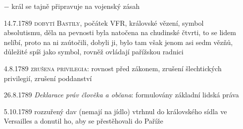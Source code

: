 \documentclass{article}
\begin{document}
\begin{itemize}
    \item[$-$] král se tajně připravuje na vojenský zásah
    \item[14.7.1789] \textsc{dobytí Bastily}, počátek VFR, královské vězení, symbol absolutismu, děla na pevnosti byla natočena na chudinské čtvrti, to se lidem nelíbí, proto na ni zaútočili, dobyli ji, bylo tam však jenom asi sedm vězňů, důležité spíš jako symbol, rovněž ovládají pařížskou radnici
    \item[4.8.1789] \textsc{zrušena privilegia}: rovnost před zákonem, zrušení šlechtických privilegií, zrušení poddanství
    \item[26.8.1789] \textit{Deklarace práv člověka a občana}: formulovány základní lidská práva
    \item[5.10.1789] rozzuřený dav (nemají na jídlo) vtrhnul do královského sídla ve Versailles a donutil ho, aby se přestěhovali do Paříže
\end{itemize}
\end{document}
